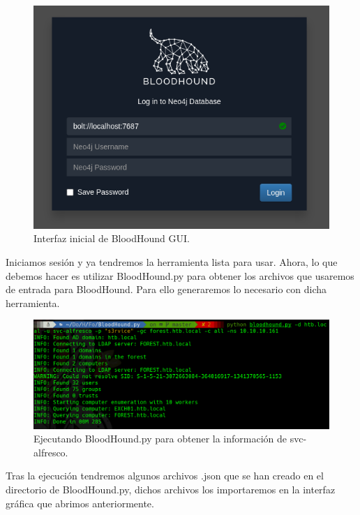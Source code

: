 \documentclass{article}
\begin{document}
\begin{figure}[H]
	\center
	\includegraphics[width=\textwidth/2]{images/forest/interfaz_bloodhound.png}
	\caption{Interfaz inicial de BloodHound GUI.}
\end{figure}

Iniciamos sesión y ya tendremos la herramienta lista para usar. Ahora, lo que debemos hacer es utilizar BloodHound.py para obtener los archivos que usaremos de entrada para BloodHound. Para ello generaremos lo necesario con dicha herramienta.

\begin{figure}[H]
	\center
	\includegraphics[width=\textwidth]{images/forest/ejecutandobloodhound.py.png}
	\caption{Ejecutando BloodHound.py para obtener la información de svc-alfresco.}
\end{figure}

Tras la ejecución tendremos algunos archivos .json que se han creado en el directorio de BloodHound.py, dichos archivos los importaremos en la interfaz gráfica que abrimos anteriormente.
\end{document}
